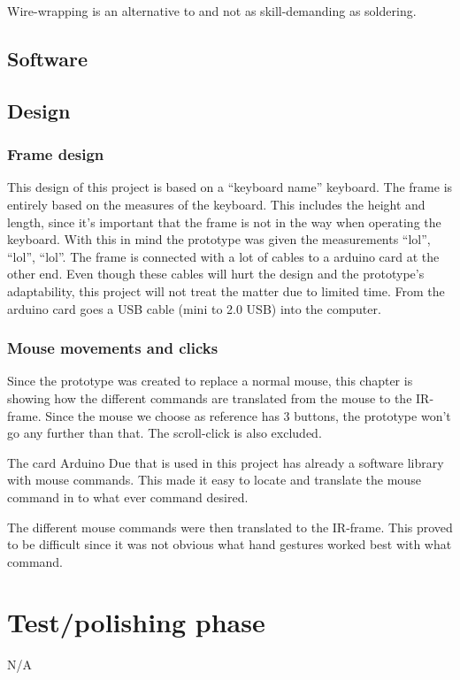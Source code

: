 Wire-wrapping is an alternative to and not as skill-demanding as soldering.

\subsection{Software}

\subsection{Design}
\subsubsection{Frame design}
This design of this project is based on a “keyboard name” keyboard. The frame is 
entirely based on the measures of the keyboard. This includes the height and length, 
since it’s important that the frame is not in the way when operating the keyboard. 
With this in mind the prototype was given the measurements “lol”, “lol”, “lol”. The 
frame is connected with a lot of cables to a arduino card at the other end. Even 
though these cables will hurt the design and the prototype’s adaptability, this project 
will not treat the matter due to limited time. From the arduino card goes a 
USB cable (mini to 2.0 USB)  into the computer.

\subsubsection{Mouse movements and clicks}
 Since the prototype was created to replace a normal mouse, this chapter is showing 
 how the different commands are translated from the mouse to the IR-frame. 
 Since the mouse we choose as reference has 3 buttons, the prototype won’t go any 
 further than that. The scroll-click is also excluded.

The card Arduino Due that is used in this project has already a software library 
with mouse commands. This made it easy to locate and translate the mouse command in to
what ever command desired.

The different mouse commands were then translated to the IR-frame. This proved to be 
difficult since it was not obvious what hand gestures worked best with what command. 

\section{Test/polishing phase}
N/A